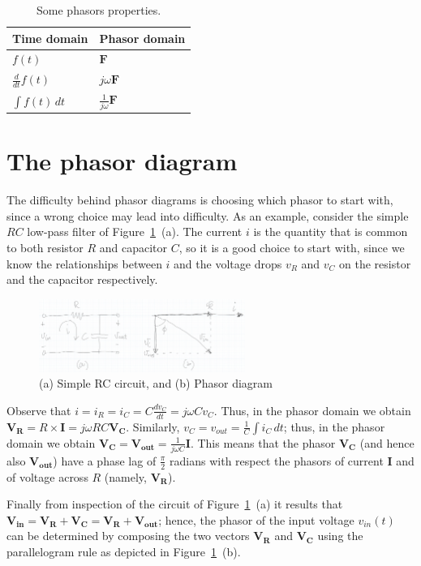 \begin{table}[h!]
\label{tab:phasors}
  \centering
  \begin{tabular}{ l  l }
  Time domain        & Phasor domain \\\hline
  $f(t)$             & $\bm{F}$ \\
  $\frac{d}{dt}f(t)$ & $j\omega\bm{F}$ \\
  $\int f(t)\,dt$        & $\frac{1}{j\omega}\bm{F}$\\
  \end{tabular}
  \caption{Some phasors properties.}
\end{table}

\section{The phasor diagram}
The difficulty behind phasor diagrams is choosing which phasor to start with, since a wrong choice may lead into difficulty. As an example, consider the simple $RC$ low-pass filter of Figure~\ref{Fig:Phasors}~(a). The current $i$ is the quantity that is common to both resistor $R$ and capacitor $C$, so it is a good choice to start with, since we know the relationships between $i$ and the voltage drops $v_R$ and $v_C$ on the resistor and the capacitor respectively.
\begin{figure}[h!]
  \centering
  \includegraphics[width=0.6\textwidth]{"images/Fig-02"}
  \caption{(a) Simple RC circuit, and (b) Phasor diagram} 
  \label{Fig:Phasors}
\end{figure}
Observe that $i = i_R = i_C = C\frac{dv_C}{dt}= j\omega Cv_C$. Thus, in the phasor domain we obtain $\bm{V_R} = R\times \bm{I} = j\omega RC\bm{V_C}$. Similarly, $v_C = v_{out} = \frac{1}{C}\int i_C\,dt$; thus, in the phasor domain we obtain $\bm{V_C} = \bm{V_{out}} = \frac{1}{j\omega C} \bm{I}$. This means that the phasor $\bm{V_C}$ (and hence also $\bm{V_{out}}$) have a phase lag of $\frac{\pi}{2}$ radians with respect the phasors of current $\bm{I}$ and of voltage across $R$ (namely, $\bm{V_R}$). 

Finally from inspection of the circuit of Figure~\ref{Fig:Phasors}~(a) it results that $\bm{V_{in}} = \bm{V_R} + \bm{V_C} =\bm{V_R} + \bm{V_{out}}$; hence, the phasor of the input voltage $v_{in}(t)$ can be determined by composing the two vectors $\bm{V_R}$ and $\bm{V_C}$ using the parallelogram rule as depicted in Figure~\ref{Fig:Phasors}~(b).


